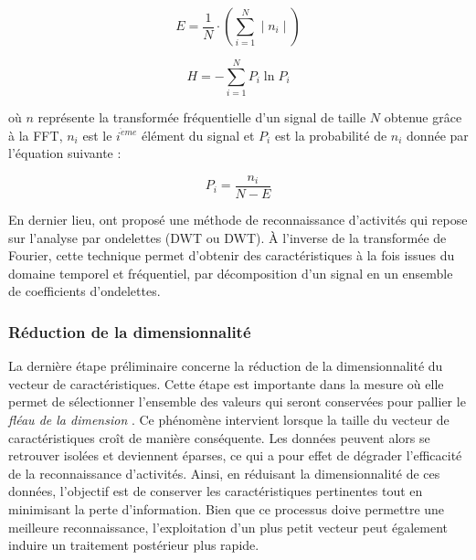 \begin{equation}
	\label{eq:energy_spec}
	E = \frac{1}{N}\cdot\left(\sum_{i=1}^{N}\mid{}n_i\mid\right)
\end{equation}

\begin{equation}
	\label{eq:entropy}
	H = - \sum_{i=1}^{N}{P_i}\ln P_i
\end{equation}

\noindent où $n$ représente la transformée fréquentielle d'un signal de taille $N$ obtenue grâce à la \acs{FFT}, $n_i$ est le $i^{\grave{e}me}$ élément du signal et $P_i$ est la probabilité de $n_i$ donnée par l'équation suivante :

\begin{equation}
	\label{eq:pi}
	 P_i = \frac{n_i}{N - E}
\end{equation}

En dernier lieu, \cite{Mitchell2013} ont proposé une méthode de reconnaissance d'activités qui repose sur l'analyse par ondelettes (\acl{DWT} ou \acs{DWT}). À l'inverse de la transformée de Fourier, cette technique permet d'obtenir des caractéristiques à la fois issues du domaine temporel et fréquentiel, par décomposition d'un signal en un ensemble de coefficients d'ondelettes.

\subsubsection{Réduction de la dimensionnalité}

La dernière étape préliminaire concerne la réduction de la dimensionnalité du vecteur de caractéristiques. Cette étape est importante dans la mesure où elle permet de sélectionner l'ensemble des valeurs qui seront conservées pour pallier le \textit{fléau de la dimension} \citep{Bellman1957}. Ce phénomène intervient lorsque la taille du vecteur de caractéristiques croît de manière conséquente. Les données peuvent alors se retrouver isolées et deviennent éparses, ce qui a pour effet de dégrader l'efficacité de la reconnaissance d'activités. Ainsi, en réduisant la dimensionnalité de ces données, l'objectif est de conserver les caractéristiques pertinentes tout en minimisant la perte d'information. Bien que ce processus doive permettre une meilleure reconnaissance, l'exploitation d'un plus petit vecteur peut également induire un traitement postérieur plus rapide.

